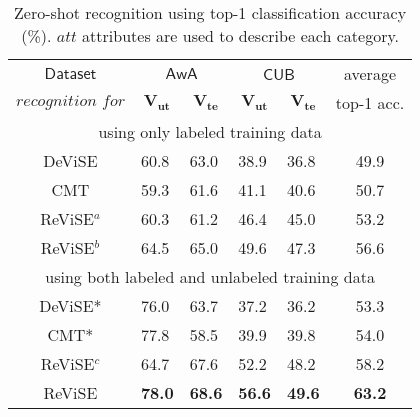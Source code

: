 {\begin{table}[t!]
\centering
\caption{\footnotesize Zero-shot recognition using top-1 classification accuracy (\%). $\textit{att}$ attributes are used to describe each category.}
\vspace{1mm}
\scalebox{0.72}
{
\begin{tabular}{|c||ll||ll||c|}
\hline
$\mathsf{Dataset}$ & \multicolumn{2}{c||}{$\mathsf{AwA}$}                                                      & \multicolumn{2}{c||}{$\mathsf{CUB}$}                                                     & average                          \\
                    $\textit{recognition for}$    & \multicolumn{1}{c}{$\mathbf{V_{ut}}$} & \multicolumn{1}{c||}{$\mathbf{V_{te}}$} & \multicolumn{1}{c}{$\mathbf{V_{ut}}$} & \multicolumn{1}{c||}{$\mathbf{V_{te}}$} & top-1 acc. \\ \hline\hline
\multicolumn{6}{|c|}{using only labeled training data}                                                                                                                                                                                     \\ \hline \hline
DeViSE \cite{frome2013devise}                         &        60.8        &          63.0         &       38.9       &              36.8            &        49.9                       \\
CMT \cite{socher2013zero}                 &    59.3      &    61.6   &         41.1   &        40.6         &    50.7                 \\
ReViSE$^a$        &     60.3      &      61.2        &    46.4      &        45.0      &        53.2              \\
ReViSE$^b$        &     64.5           &     65.0         &     49.6         &              47.3            &      56.6               \\ \hline \hline
\multicolumn{6}{|c|}{using both labeled and unlabeled training data}   \\ \hline \hline
DeViSE* \cite{frome2013devise}             &   76.0        &       63.7       &     37.2    &          36.2          &    53.3             \\
CMT* \cite{socher2013zero}       &    77.8     &       58.5     &     39.9      &              39.8          &   54.0              \\
ReViSE$^c$        &   64.7         &     67.6        &   52.2     &    48.2   &       58.2        \\
ReViSE       &    {\bf 78.0  }      &   {\bf 68.6   }   &     {\bf 56.6   }   &  {\bf 49.6    }  &        {\bf 63.2}           \\ \hline
\end{tabular}
}
\label{tbl:induc_zero_recog}
\vspace{-1mm}
\end{table}

}
